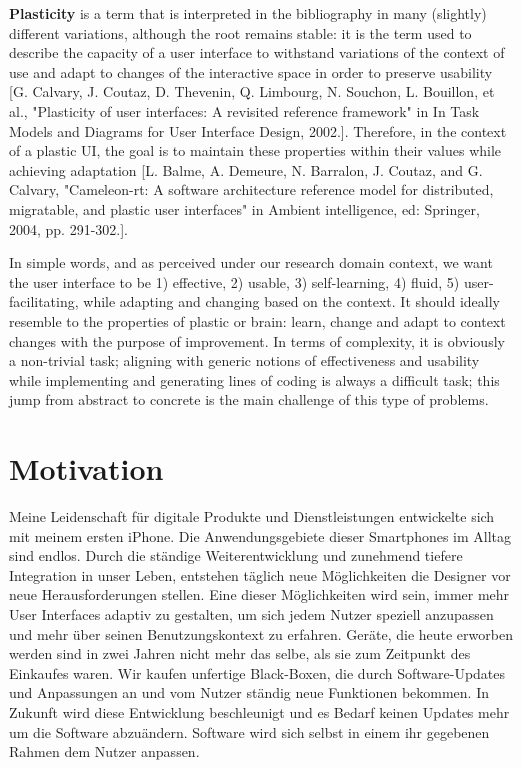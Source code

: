 \textbf{Plasticity} is a term that is interpreted in the bibliography in many (slightly) different variations,
although the root remains stable: it is the term used to describe the capacity of a user interface to withstand variations %
of the context of use and adapt to changes of the interactive space in order to preserve usability [G. Calvary, J. Coutaz, D. Thevenin, Q. Limbourg, N. Souchon, L. Bouillon, et al., "Plasticity of user interfaces: A revisited reference framework" in In Task Models and Diagrams for User Interface Design, 2002.].
Therefore, in the context of a plastic UI, the goal is to maintain these properties within their values while achieving adaptation [L. Balme, A. Demeure, N. Barralon, J. Coutaz, and G. Calvary, "Cameleon-rt: A software architecture reference model for distributed, migratable, and plastic user interfaces" in Ambient intelligence, ed: Springer, 2004, pp. 291-302.].

In simple words, and as perceived under our research domain context, we want the user interface to be
1) effective,
2) usable,
3) self-learning,
4) fluid,
5) user-facilitating,
while adapting and changing based on the context. It should ideally resemble to the properties of plastic or brain:
learn, change and adapt to context changes with the purpose of improvement.
In terms of complexity, it is obviously a non-trivial task; aligning with generic notions of effectiveness and usability
while implementing and generating lines of coding is always a difficult task; this jump from abstract to concrete is
the main challenge of this type of problems.


\section{Motivation}
Meine Leidenschaft für digitale Produkte und Dienstleistungen entwickelte sich mit meinem ersten iPhone. 
Die Anwendungsgebiete dieser Smartphones im Alltag sind endlos. Durch die ständige Weiterentwicklung 
und zunehmend tiefere Integration in unser Leben, entstehen täglich neue Möglichkeiten die Designer vor 
neue Herausforderungen stellen. Eine dieser Möglichkeiten wird sein, immer mehr User Interfaces adaptiv zu gestalten, 
um sich jedem Nutzer speziell anzupassen und mehr über seinen Benutzungskontext zu erfahren. Geräte, die 
heute erworben werden sind in zwei Jahren nicht mehr das selbe, als sie zum Zeitpunkt des Einkaufes waren. 
Wir kaufen unfertige Black-Boxen, 
die durch Software-Updates und Anpassungen an und vom Nutzer ständig neue Funktionen bekommen. %
In Zukunft wird diese Entwicklung beschleunigt und es Bedarf keinen Updates mehr um die Software abzuändern. 
Software wird sich selbst in einem ihr gegebenen Rahmen dem Nutzer anpassen. 

